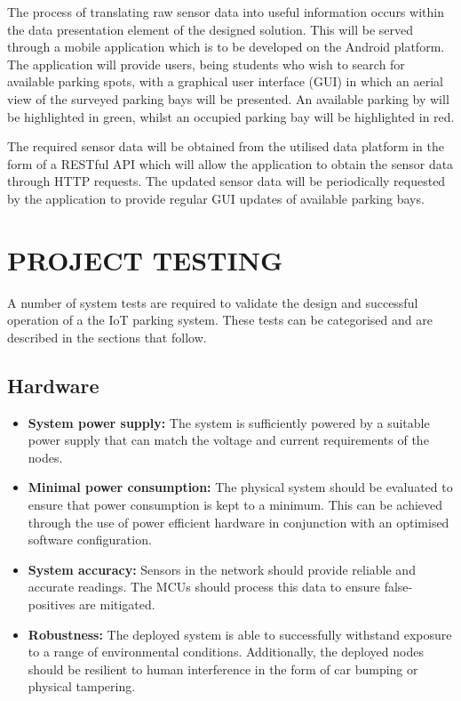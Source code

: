 \documentclass[10pt,twocolumn]{witseiepaper}
\begin{document}
		The process of translating raw sensor data into useful information occurs within the data presentation element of the designed solution. This will be served through a mobile application which is to be developed on the Android platform. The application will provide users, being students who wish to search for available parking spots, with a graphical user interface (GUI) in which an aerial view of the surveyed parking bays will be presented. An available parking by will be highlighted in green, whilst an occupied parking bay will be highlighted in red.

		The required sensor data will be obtained from the utilised data platform in the form of a RESTful API which will allow the application to obtain the sensor data through HTTP requests. The updated sensor data will be periodically requested by the application to provide regular GUI updates of available parking bays.
	
\section{PROJECT TESTING}
	A number of system tests are required to validate the design and successful operation of a the IoT parking system. These tests can be categorised and are described in the sections that follow.

	\subsection{Hardware}
		\begin{itemize}
			\item \textbf{System power supply:} The system is sufficiently powered by a suitable power supply that can match the voltage and current requirements of the nodes.
			\vspace{1em}
			\item \textbf{Minimal power consumption:} The physical system should be evaluated to ensure that power consumption is kept to a minimum. This can be achieved through the use of power efficient hardware in conjunction with an optimised software configuration.
			\vspace{1em}
			\item \textbf{System accuracy:} Sensors in the network should provide reliable and accurate readings. The MCUs should process this data to ensure false-positives are mitigated.
			\vspace{1em}
			\item \textbf{Robustness:} The deployed system is able to successfully withstand exposure to a range of environmental conditions. Additionally, the deployed nodes should be resilient to human interference in the form of car bumping or physical tampering.
		\end{itemize}
	
\end{document}
